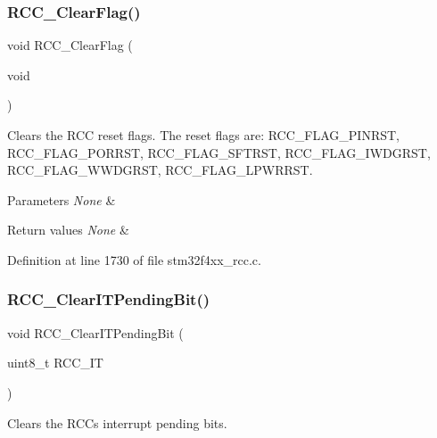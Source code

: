 \subsubsection{\texorpdfstring{R\+C\+C\+\_\+\+Clear\+Flag()}{RCC\_ClearFlag()}}
{\footnotesize\ttfamily void R\+C\+C\+\_\+\+Clear\+Flag (\begin{DoxyParamCaption}\item[{void}]{ }\end{DoxyParamCaption})}



Clears the R\+CC reset flags. The reset flags are\+: R\+C\+C\+\_\+\+F\+L\+A\+G\+\_\+\+P\+I\+N\+R\+ST, R\+C\+C\+\_\+\+F\+L\+A\+G\+\_\+\+P\+O\+R\+R\+ST, R\+C\+C\+\_\+\+F\+L\+A\+G\+\_\+\+S\+F\+T\+R\+ST, R\+C\+C\+\_\+\+F\+L\+A\+G\+\_\+\+I\+W\+D\+G\+R\+ST, R\+C\+C\+\_\+\+F\+L\+A\+G\+\_\+\+W\+W\+D\+G\+R\+ST, R\+C\+C\+\_\+\+F\+L\+A\+G\+\_\+\+L\+P\+W\+R\+R\+ST. 


\begin{DoxyParams}{Parameters}
{\em None} & \\
\hline
\end{DoxyParams}

\begin{DoxyRetVals}{Return values}
{\em None} & \\
\hline
\end{DoxyRetVals}


Definition at line 1730 of file stm32f4xx\+\_\+rcc.\+c.

\mbox{\label{group___r_c_c_ga529842d165910f8f87e26115da36089b}} 
\subsubsection{\texorpdfstring{R\+C\+C\+\_\+\+Clear\+I\+T\+Pending\+Bit()}{RCC\_ClearITPendingBit()}}
{\footnotesize\ttfamily void R\+C\+C\+\_\+\+Clear\+I\+T\+Pending\+Bit (\begin{DoxyParamCaption}\item[{uint8\+\_\+t}]{R\+C\+C\+\_\+\+IT }\end{DoxyParamCaption})}



Clears the R\+CC\textquotesingle{}s interrupt pending bits. 


